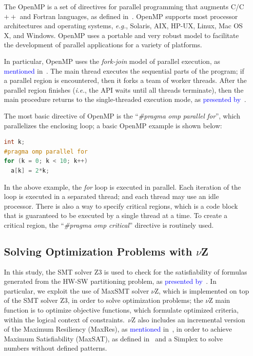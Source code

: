 \documentclass{doublecol-new}
\theoremstyle{TH}{
\newtheorem{lemma}{Lemma}
\newtheorem{theorem}[lemma]{Theorem}
\newtheorem{corrolary}[lemma]{Corrolary}
\newtheorem{conjecture}[lemma]{Conjecture}
\newtheorem{proposition}[lemma]{Proposition}
\newtheorem{claim}[lemma]{Claim}
\newtheorem{stheorem}[lemma]{Wrong Theorem}
\newtheorem{algorithm}{Algorithm}
}
\theoremstyle{THrm}{
\newtheorem{definition}{Definition}[section]
\newtheorem{question}{Question}[section]
\newtheorem{remark}{Remark}
\newtheorem{scheme}{Scheme}
}
\theoremstyle{THhit}{
\newtheorem{case}{Case}[section]
}
\begin{document}
The OpenMP is a set of directives for parallel programming that augments C/C$++$ and Fortran languages, as defined in~\cite{OpenMP1998}. OpenMP supports most processor architectures and operating systems, {\it e.g.}, Solaris, AIX, HP-UX, Linux, Mac OS X, and Windows. OpenMP uses a portable and very robust model to facilitate the development of parallel applications for a variety of platforms. 

In particular, OpenMP uses the \textit{fork-join} model of parallel execution, as \textcolor{blue}{mentioned} in~\cite{OpenMP1998}. The main thread executes the sequential parts of the program; if a parallel region is encountered, then it forks a team of worker threads. After the parallel region finishes ({\it i.e.}, the API waits until all threads terminate), then the main procedure returns to the single-threaded execution mode, as \textcolor{blue}{presented by}~\cite{Wu2014}.

The most basic directive of OpenMP is the ``\textit{\#pragma omp parallel for}'', which parallelizes the enclosing loop; a basic OpenMP example is shown below:

\begin{lstlisting}[basicstyle=\footnotesize,label={lst:example}, language=C, numberstyle=\tiny, numbersep=7pt,frame=tb,captionpos=t, caption={OpenMP basic Example.}]
int k;
#pragma omp parallel for
for (k = 0; k < 10; k++)
  a[k] = 2*k;
\end{lstlisting}

\vspace{2 mm}
In the above example, the {\it for} loop is executed in parallel. Each iteration of the loop is executed in a separated thread; and each thread may use an idle processor. There is also a way to specify critical regions, which is a code block that is guaranteed to be executed by a single thread at a time. To create a critical region, the ``\textit{\#pragma omp critical}'' directive is routinely used.

\subsection{Solving Optimization Problems with $\nu$Z}
\label{Optimization-with-Vz}

In this study, the SMT solver Z3 is used to check for the satisfiability of formulas generated from the HW-SW partitioning problem, as \textcolor{blue}{presented by}~\cite{Bjorner2014}. In particular, we exploit the use of MaxSMT solver $\nu$Z, which is implemented on top of the SMT solver Z3, in order to solve optimization problems; the $\nu$Z main function is to optimize objective functions, which formulate optimized criteria, within the logical context of constraints.~$\nu$Z also includes an incremental version of the Maximum Resiliency (MaxRes), as \textcolor{blue}{mentioned} in~\cite{Federica2008}, in order to achieve Maximum Satisfiability (MaxSAT), as defined in~\cite{NarodytskaN} and a Simplex to solve numbers without defined patterns. 
\end{document}
